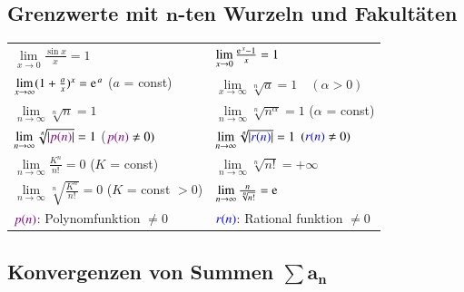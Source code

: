 \subsection[Grenzwerte mit n-ten Wurzeln und Fakultäten]{Grenzwerte mit $\bm{n}$-ten Wurzeln und Fakultäten}

\renewcommand{\arraystretch}{2.3}
\begin{tabular}{ll}
    $\lim\limits_{x \to 0} \frac{\sin x}{x} = 1$                                    & $\lim\limits_{x \to 0} \frac{\e^x - 1}{x} = 1$                                \\
    $\lim\limits_{x \to \infty} (1 + \frac{a}{x})^x = \e^a$ ($a$ = const)           & $\lim\limits_{x \to \infty} \sqrt[n]{a} = 1 \quad (\alpha > 0)$                                  \\
    $\lim\limits_{n \to \infty} \sqrt[n]{n} = 1$                                    & $\lim\limits_{n \to \infty} \sqrt[n]{n^{\alpha}} = 1$ ($\alpha$ = const)      \\
    $\lim\limits_{n \to \infty} \sqrt[n]{\vert {\color{violet}p(n)} \vert} = 1$ (${\color{violet}p(n)} \neq 0)$     & $\lim\limits_{n \to \infty} \sqrt[n]{\vert {\color{blue}r(n)} \vert} = 1$ $({\color{blue}r(n)} \neq 0)$   \\ 
    $\lim\limits_{n \to \infty} \frac{K^n}{n!} = 0$ ($K$ = const)                    & $\lim\limits_{n \to \infty} \sqrt[n]{n!} = + \infty$                          \\
    $\lim\limits_{n \to \infty} \sqrt[n]{\frac{K^n}{n!}} = 0$ ($K$ = const $> 0$)   & $\lim\limits_{n \to \infty} \frac{n}{\sqrt[n]{n!}} = \e$\\
    ${\color{violet}p(n)}$: Polynomfunktion $\neq 0$                                                & ${\color{blue}r(n)}$: Rational funktion $\neq 0$
\end{tabular}
\renewcommand{\arraystretch}{1}


\subsection[Konvergenzen von Summen]{Konvergenzen von Summen $\bm{\sum a_n}$}

